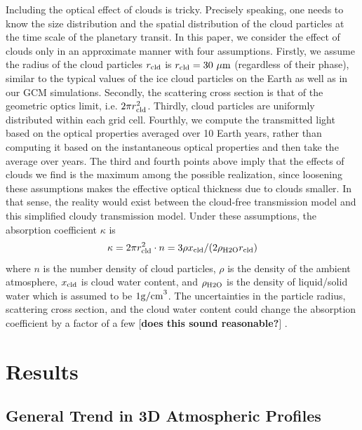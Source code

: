 \documentclass[11pt,numberedappendix,twocolappendix,]{emulateapj}
\def\memo#1{\color{red}$[${\bf #1}$]$ \color{black}}
\begin{document}
Including the optical effect of clouds is tricky. 
Precisely speaking, one needs to know the size distribution and the spatial distribution of the cloud particles at the time scale of the planetary transit. 
In this paper, we consider the effect of clouds only in an approximate manner with four assumptions. 
%
Firstly, we assume the radius of the cloud particles $r_{\rm cld}$ is $r_{\rm cld}=30~\mu {\rm m}$ (regardless of their phase), similar to the typical values of the ice cloud particles on the Earth as well as in our GCM simulations.  
%
Secondly, the scattering cross section is that of the geometric optics limit, i.e. $2 \pi r_{\rm cld}^2$. 
%
Thirdly, cloud particles are uniformly distributed within each grid cell. 
%
Fourthly, we compute the transmitted light based on the optical properties  averaged over 10 Earth years, rather than computing it based on the instantaneous optical properties and then take the average over years. 
%
The third and fourth points above imply that the effects of clouds we find is the maximum among the possible realization, since loosening these assumptions makes the effective optical thickness due to clouds smaller. 
In that sense, the reality would exist between the cloud-free transmission model and this simplified cloudy transmission model. 
Under these assumptions, the absorption coefficient $\kappa $ is %
\begin{equation}
\kappa = 2 \pi r_{\rm cld}^2 \cdot n = 3 \rho x_{\rm cld} / ( 2 \rho_{\rm H2O} r_{\rm cld} )
\end{equation}
where $n$ is the number density of cloud particles, $\rho $ is the density of the ambient atmosphere, $x_{\rm cld}$ is cloud water content, and $\rho_{\rm H2O}$ is the density of liquid/solid water which is assumed to be $1 {\rm g/cm}^3$. 
The uncertainties in the particle radius, scattering cross section, and the cloud water content could change the absorption coefficient by a factor of a few \memo{does this sound reasonable?}. 



\section{Results}
\label{s:results}


\subsection{General Trend in 3D Atmospheric Profiles}
\label{ss:result_H2Omixingratio}
\end{document}
